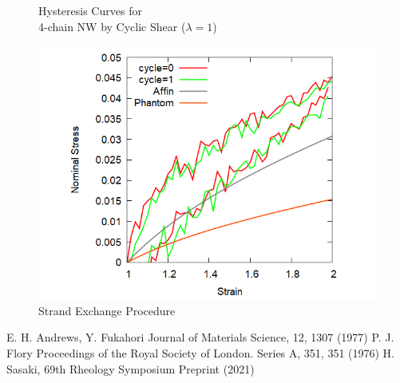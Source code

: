 \documentclass[uplatex,dvipdfmx,a4paper,12pt]{article}
\begin{document}
\begin{figure}[hb]
\begin{minipage}{0.33\hsize}
\begin{center}
        \vspace{1mm}
        \caption{Hysteresis Curves for \\4-chain NW by Cyclic Shear ($\lambda = 1$)}
        \label{fig:hyst}
        \end{center}
    \end{minipage}
    \begin{minipage}{0.33\hsize}
        \begin{center}
        \includegraphics[width=\textwidth]{hyst_4Chain.png}
        \vspace{1mm}
        \caption{Strand Exchange Procedure}
        \label{fig:exc}
        \end{center}
    \end{minipage}
\end{figure}

\begin{thebibliography}{99}
    \small %
    \setlength{\itemsep}{-2pt} %
     E. H. Andrews, Y. Fukahori Journal of Materials Science, 12, 1307 (1977)
     P. J. Flory Proceedings of the Royal Society of London. Series A, 351, 351 (1976)
     H. Sasaki, 69th Rheology Symposium Preprint (2021)
\end{thebibliography}
\end{document}
